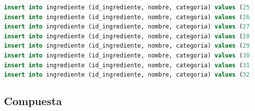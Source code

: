 \documentclass[12pt,letterpaper]{article}
\begin{document}
\begin{lstlisting}[language=sql]
insert into ingrediente (id_ingrediente, nombre, categoria) values (25,"Queso rallado","Lacteos");
insert into ingrediente (id_ingrediente, nombre, categoria) values (26,"Lechuga","Frutas y hortalizas");
insert into ingrediente (id_ingrediente, nombre, categoria) values (27,"Habas","Frutas y hortalizas");
insert into ingrediente (id_ingrediente, nombre, categoria) values (28,"Limon","Frutas y hortalizas");
insert into ingrediente (id_ingrediente, nombre, categoria) values (29,"Oregano","Condimentos");
insert into ingrediente (id_ingrediente, nombre, categoria) values (30,"Arroz","Cereales");
insert into ingrediente (id_ingrediente, nombre, categoria) values (31,"Calamares","Productos pesqueros");
insert into ingrediente (id_ingrediente, nombre, categoria) values (32,"Gambas","Productos pesqueros");
\end{lstlisting}

\subsection {Compuesta}
\end{document}
